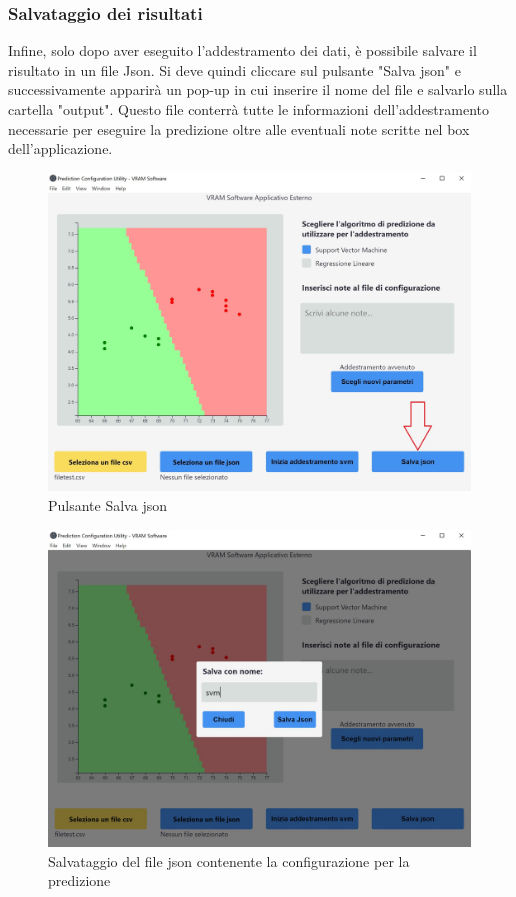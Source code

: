 		\subsubsection{Salvataggio dei risultati}
		Infine, solo dopo aver eseguito l'addestramento dei dati, è possibile salvare il risultato in un file Json. Si deve quindi cliccare sul pulsante "Salva json" e successivamente apparirà un pop-up in cui inserire il nome del file e salvarlo sulla cartella "output". Questo file conterrà tutte le informazioni dell'addestramento necessarie per eseguire la predizione oltre alle eventuali note scritte nel box dell'applicazione.
		\mbox{}
		\begin{figure} [H]
			\begin{center}
				\includegraphics[width=112mm]{./img/4-2.jpg}
			\end{center}
			\caption{Pulsante Salva json}
		\end{figure}
		\mbox{}
		\mbox{}
		\begin{figure} [H]
			\begin{center}
				\includegraphics[width=112mm]{./img/5.jpg}
			\end{center}
			\caption{Salvataggio del file json contenente la configurazione per la predizione}
		\end{figure}
		\mbox{}
		
